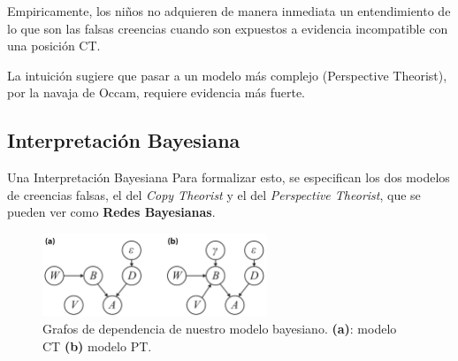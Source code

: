 \documentclass{beamer}
\begin{document}
\begin{frame}

Empiricamente, los niños no adquieren de manera inmediata un entendimiento de lo que son las falsas creencias cuando son expuestos a evidencia incompatible con una posición CT\@.

La intuición sugiere que pasar a un modelo más complejo (Perspective Theorist), por la navaja de Occam, requiere evidencia más fuerte.
\end{frame}

\subsection{Interpretación Bayesiana}

\begin{frame}[fragile]{Una Interpretación Bayesiana}
Para formalizar esto, se especifican los dos modelos de creencias falsas, el del \textit{Copy Theorist} y el del \textit{Perspective Theorist}, que se pueden ver como \textbf{Redes Bayesianas}.

\begin{figure}
\includegraphics[width=0.6\textwidth]{imagenes/modelos.png}
\caption{Grafos de dependencia de nuestro modelo bayesiano. \textbf{(a)}: modelo CT \textbf{(b)} modelo PT.}
\end{figure}
\end{frame}
\end{document}
